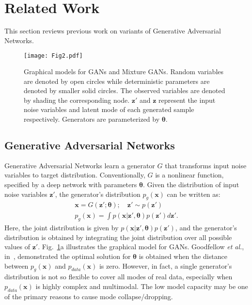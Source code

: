 \documentclass{article}
\def\etal{\emph{et al.}}
\begin{document}
\section{Related Work}
\label{sec:Previous}

This section reviews previous work on variants of Generative Adversarial Networks.
\begin{figure}
  \centering
    \texttt{[image: Fig2.pdf]}
     \caption{Graphical models for GANs and Mixture GANs. Random variables are denoted by open circles while deterministic parameters are denoted by smaller solid circles. The observed variables are denoted by shading the corresponding node. $\mathbf{z}'$ and $\mathbf{z}$ represent the input noise variables and latent mode of each generated sample respectively. Generators are parameterized by $\bm{\theta}$.}
     \label{fig:GANs}
\end{figure}

\subsection{Generative Adversarial Networks}
\label{sec:GANs}


Generative Adversarial Networks learn a generator $G$ that transforms input noise variables to target distribution.
Conventionally, $G$ is a nonlinear function, specified by a deep network with parameters $\bm{\theta}$.
Given the distribution of input noise variables $\mathbf{z}'$, the generator's distribution $p_g\left(\mathbf{x}\right)$ can be written as:
\begin{gather}
\mathbf{x} = G\left(\mathbf{z}'; \bm{\theta}\right);\quad \mathbf{z}'\sim p\left(\mathbf{z}'\right) \nonumber \\
p_g\left(\mathbf{x}\right)
=
\int
p\left(\mathbf{x}|\mathbf{z}', \bm{\theta}\right) p\left(\mathbf{z}'\right)
d\mathbf{z}'.
\label{eq:Back1}
\end{gather}
Here, the joint distribution is given by $p\left(\mathbf{x}|\mathbf{z}', \bm{\theta}\right) p\left(\mathbf{z}'\right)$, and the generator's distribution is obtained by integrating the joint distribution over all possible values of $\mathbf{z}'$.
Fig.~\ref{fig:GANs}a illustrates the graphical model for GANs.
Goodfellow \etal, in~\cite{goodfellow2014generative}, demonstrated the optimal solution for $\bm{\theta}$ is obtained when the distance between $p_g\left(\mathbf{x}\right)$ and $p_{data}\left(\mathbf{x}\right)$ is zero.
However, in fact, a single generator's distribution is not so flexible to cover all modes of real data, especially when $p_{data}\left(\mathbf{x}\right)$ is highly complex and multimodal.
The low model capacity may be one of the primary reasons to cause mode collapse/dropping.
\end{document}
